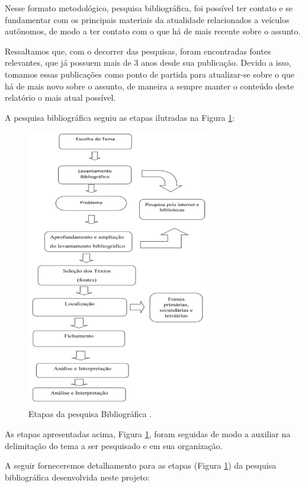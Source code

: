 Nesse formato metodológico, pesquisa bibliográfica, foi possível ter contato e se fundamentar com os principais materiais da atualidade relacionados a veículos autônomos, de modo a ter contato com o que há de mais recente sobre o assunto.

Ressaltamos que, com o decorrer das pesquisas, foram encontradas fontes relevantes, que já possuem mais de 3 anos desde sua publicação. Devido a isso, tomamos essas publicações como ponto de partida para atualizar-se sobre o que há de mais novo sobre o assunto, de maneira a sempre manter o conteúdo deste relatório o mais atual possível.

A pesquisa bibliográfica seguiu as etapas ilutradas na Figura \ref{img_bibli}:

\begin{figure}[H]
\centering
\includegraphics[width=8cm]{Figures/bibli.png}
\caption{Etapas da pesquisa Bibliográfica \cite{bibli}.}
\label{img_bibli}
\end{figure}

As etapas apresentadas acima, Figura \ref{img_bibli}, foram seguidas de modo a auxiliar na
delimitação do tema a ser pesquisado e em sua organização.

\vspace {1cm}


A seguir forneceremos detalhamento para as etapas (Figura \ref{img_bibli}) da pesquisa bibliográfica desenvolvida neste projeto:

